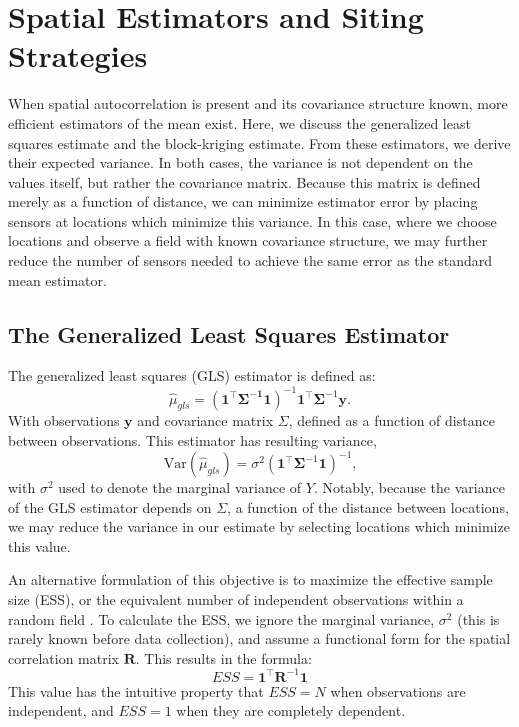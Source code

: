 \section{Spatial Estimators and Siting Strategies}
\label{sec:si_estimators}
When spatial autocorrelation is present and its covariance structure known, more efficient estimators of the mean exist. Here, we discuss the generalized least squares estimate and the block-kriging estimate. From these estimators, we derive their expected variance. In both cases, the variance is not dependent on the values itself, but rather the covariance matrix. Because this matrix is defined merely as a function of distance, we can minimize estimator error by placing sensors at locations which minimize this variance. In this case, where we choose locations and observe a field with known covariance structure, we may further reduce the number of sensors needed to achieve the same error as the standard mean estimator.

\subsection{The Generalized Least Squares Estimator}
\label{sec:si_gls}

The generalized least squares (GLS) estimator is defined as:
\begin{equation}
 \hat{\mu}_{gls} = (\mathbf{1}^\top\bm{\Sigma^{-1}}\mathbf{1})^{-1}\mathbf{1}^\top \bm{\Sigma}^{-1}\mathbf{y}.
\end{equation}
With observations $\mathbf{y}$ and covariance matrix $\Sigma$, defined as a function of distance between observations. This estimator has resulting variance,
\begin{equation}
 \text{Var}(\hat{\mu}_{gls})=\sigma^2(\mathbf{1}^\top \bm{\Sigma}^{-1}\mathbf{1})^{-1}\text{,}
\end{equation}
with $\sigma^2$ used to denote the marginal variance of $Y$. Notably, because the variance of the GLS estimator depends on $\Sigma$, a function of the distance between locations, we may reduce the variance in our estimate by selecting locations which minimize this value.

An alternative formulation of this objective is to maximize the effective sample size (ESS), or the equivalent number of independent observations within a random field \cite{kagan1997averaging, taylor1922diffusion, vallejos_2014_EffectiveSampleSize,der1990meteorological}. To calculate the ESS, we ignore the marginal variance, $\sigma^2$ (this is rarely known before data collection), and assume a functional form for the spatial correlation matrix $\mathbf{R}$. This results in the formula:
\begin{equation}
 ESS = \bm{1}^\top \mathbf{R}^{-1}\bm{1}
\end{equation}
This value has the intuitive property that $ESS=N$ when observations are independent, and $ESS = 1$ when they are completely dependent.

